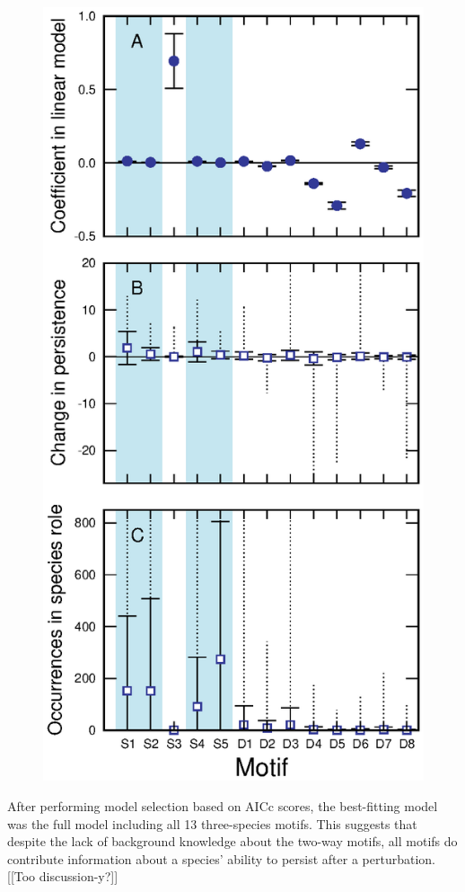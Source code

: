 \documentclass[12pt]{article}
\begin{document}
\begin{figure}[hb!]
			\includegraphics[height=.5\textheight]{figures/extinction_order/motif_lmer_summary.eps}
			\end{figure}


		After performing model selection based on AICc scores, the best-fitting model was the full model including all 13 three-species motifs.
		This suggests that despite the lack of background knowledge about the two-way motifs, all motifs do contribute information about a species' ability to persist after a perturbation. [[Too discussion-y?]]
\end{document}
